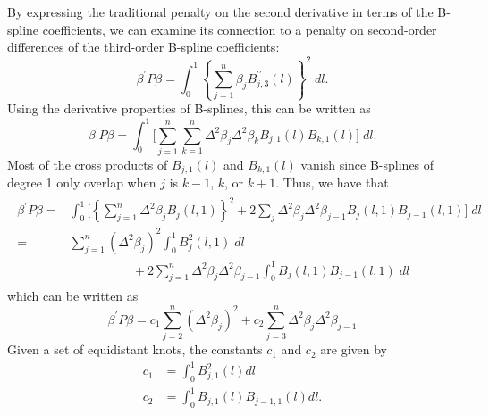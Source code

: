 \documentclass[12pt]{article}
\theoremstyle{definition}
\begin{document}
By expressing the traditional penalty on the second derivative in terms of the B-spline coefficients, we can examine its connection to a penalty on second-order differences of the third-order B-spline coefficients:
\begin{equation} \label{eq:second-derivative-bspline-penalty}
\beta^\prime P \beta = \int_{0}^{1} \left\{ \sum\limits_{j=1}^n  \beta_j B_{j,3}^{\prime \prime} \left(l\right) \right\}^2\; dl.
\end{equation}
\noindent
Using the derivative properties of B-splines, this can be written as 
\begin{equation} \label{eq:second-derivative-bspline-penalty}
\beta^\prime P \beta =  \int_{0}^{1}  \bigg[ \sum\limits_{j=1}^n \sum\limits_{k=1}^n \Delta^2 \beta_j \Delta^2 \beta_k B_{j,1}\left(l\right)B_{k,1}\left(l\right)\bigg]\; dl  . 
\end{equation}
\noindent
Most of the cross products of $B_{j,1}\left(l\right)$ and $B_{k,1}\left( l \right)$ vanish since B-splines of degree 1 only overlap when $j$ is $k-1$, $k$, or $k+1$. Thus, we have that
\begin{align}
\begin{split}
\beta^\prime P \beta = {} &  \int_0^1 \bigg[ \left\{ \sum\limits_{j=1}^n   \Delta^2 \beta_j  B_j\left(l,1\right)  \right\}^2  + 2 \sum_{j}\Delta^2 \beta_j\Delta^2 \beta_{j-1}B_j\left(l,1\right)B_{j-1}\left(l,1\right) \bigg]\; dl \\ 
= {} & \sum \limits_{j=1}^n  \left( \Delta^2\beta_j \right)^2 \int_0^1 B_j^2\left(l,1\right)\;dl \\
   &{} \;\;\;\;\;\;\;\;\;\;\;\;\;\;\;\;\;\; + 2 \sum\limits_{j=1}^n \Delta^2 \beta_j\Delta^2 \beta_{j-1} \int_0^1 B_j\left(l,1\right)B_{j-1}\left(l,1\right)\;dl 
\end{split}
\end{align}
\noindent
which can be written as
\begin{equation} \label{eq:derivative-penalty-difference-penalty-connection}
\beta^\prime P \beta = c_1 \sum\limits_{j=2}^n \left( \Delta^2 \beta_j\right)^2 + c_2 \sum\limits_{j=3}^n \Delta^2 \beta_j\Delta^2 \beta_{j-1}
\end{equation}
\noindent
Given a set of equidistant knots, the constants $c_1$ and $c_2$ are given by
\begin{equation}
\begin{split}
c_1 & =   \int_0^1 B_{j,1}^2\left(l\right) dl\\
c_2 & = \int_0^1 B_{j,1}\left(l\right)B_{j-1,1}\left(l\right) dl.
\end{split}
\end{equation}
\end{document}

